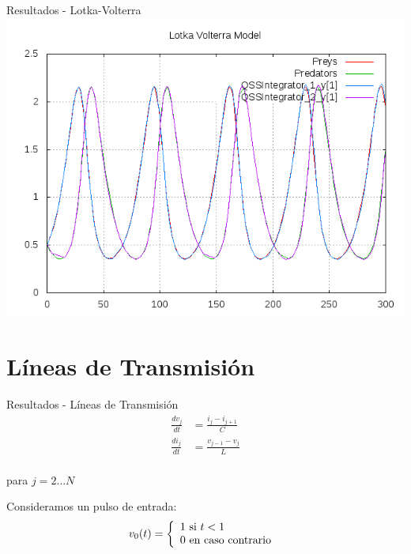 \documentclass{beamer}
\begin{document}
\begin{frame}{Resultados - Lotka-Volterra}
\includegraphics[width=\textwidth]{output/lotka_volterra/lotka_volterra-all.png}
\end{frame}

\section{Líneas de Transmisión}
\begin{frame}{Resultados - Líneas de Transmisión}
\begin{equation*}
\begin{split}
\frac{d v_{j}}{d t} &= \frac{i_{j} - i_{j+1}}{C} \\
\frac{d i_{j}}{d t} &= \frac{v_{j-1} - v_{j}}{L} \\	
\end{split}
\end{equation*}

para $j = 2 \dots N$

Consideramos un pulso de entrada:
\begin{equation*}
v_0(t) = \left\{ 
  \begin{array}{l l}
    1 \text{ si } t < 1 \\
    0 \text{ en caso contrario }
  \end{array} \right.
\end{equation*}
\end{frame}
\end{document}
